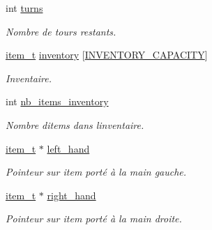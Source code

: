 \begin{DoxyCompactItemize}
int \hyperlink{structperso__t_a6d298fd23c478b7276afd67adaaa78e2}{turns}
\begin{DoxyCompactList}\small\item\em Nombre de tours restants. \end{DoxyCompactList}\item 
\mbox{\label{structperso__t_afb347e6d5a61815f8238fd45136cbddc}} 
\hyperlink{structitem__t}{item\+\_\+t} \hyperlink{structperso__t_afb347e6d5a61815f8238fd45136cbddc}{inventory} \mbox{[}\hyperlink{commun_8h_ace96e07dcfbce0348b898efd6e6d1956}{I\+N\+V\+E\+N\+T\+O\+R\+Y\+\_\+\+C\+A\+P\+A\+C\+I\+TY}\mbox{]}
\begin{DoxyCompactList}\small\item\em Inventaire. \end{DoxyCompactList}\item 
\mbox{\label{structperso__t_acceec0b28540f38c6bb75f4519c1bb6d}} 
int \hyperlink{structperso__t_acceec0b28540f38c6bb75f4519c1bb6d}{nb\+\_\+items\+\_\+inventory}
\begin{DoxyCompactList}\small\item\em Nombre d\textquotesingle{}items dans l\textquotesingle{}inventaire. \end{DoxyCompactList}\item 
\mbox{\label{structperso__t_aca1d4b8c1aeb76d509e346a0fb2ee60e}} 
\hyperlink{structitem__t}{item\+\_\+t} $\ast$ \hyperlink{structperso__t_aca1d4b8c1aeb76d509e346a0fb2ee60e}{left\+\_\+hand}
\begin{DoxyCompactList}\small\item\em Pointeur sur item porté à la main gauche. \end{DoxyCompactList}\item 
\mbox{\label{structperso__t_ae0e90f424cffee076e6c1238c1789f89}} 
\hyperlink{structitem__t}{item\+\_\+t} $\ast$ \hyperlink{structperso__t_ae0e90f424cffee076e6c1238c1789f89}{right\+\_\+hand}
\begin{DoxyCompactList}\small\item\em Pointeur sur item porté à la main droite. \end{DoxyCompactList}\item 
\mbox{\label{structperso__t_ad95e816d354cc2a3d0ed11be55c6407e}} 

\end{DoxyCompactItemize}
